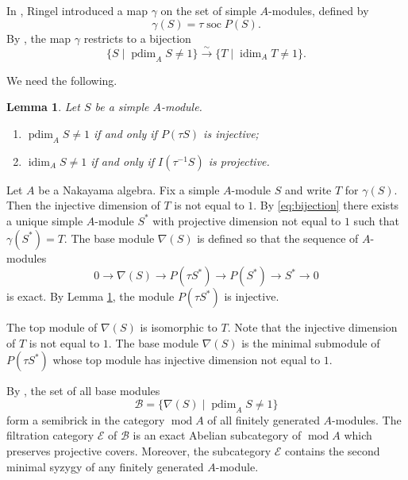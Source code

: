 \documentclass[a4paper,reqno]{amsart}
\numberwithin{equation}{section}
\theoremstyle{plain}
\newtheorem{lem}[thm]{Lemma}
\theoremstyle{definition}
\theoremstyle{remark}
\DeclareMathOperator{\soc}{soc}
\renewcommand{\mod}{\operatorname{mod}}
\DeclareMathOperator{\pdim}{pdim}
\DeclareMathOperator{\idim}{idim}
\newcommand{\lto}{\longrightarrow}
\renewcommand{\-}{\mbox{-}}
\newcommand{\scB}{\mathcal{B}}
\newcommand{\scE}{\mathcal{E}}
\begin{document}
In \cite{Rin13}, 
Ringel introduced a map \(\gamma\) on the set of simple \(A\)-modules, 
defined by
\begin{equation*} 
    \gamma(S)=\tau\soc P(S).
\end{equation*}
By  \cite[A.6]{Rin21}, the map \(\gamma\) restricts to a  bijection 
\begin{equation} \label{eq:bijection}
    \{S\mid \pdim_AS\neq 1\}\overset{\sim}\lto \{T\mid \idim_AT\neq 1\}.
\end{equation}

We need the following.

\begin{lem} \label{lem:pidim-1}
     Let \(S\) be a simple \(A\)-module.
    \begin{enumerate}
        \item \(\pdim_AS\neq 1\) if and only if \(P(\tau S)\) is injective;
        \item \(\idim_AS\neq 1\) if and only if \(I(\tau^{-1} S)\) is projective.
    \end{enumerate}
\end{lem}


Let \(A\) be a Nakayama algebra. 
Fix a simple \(A\)-module  \(S\) and write \(T\) for \(\gamma(S)\).
Then the injective dimension of \(T\) is not equal to \(1\).
By \eqref{eq:bijection} there exists a unique simple \(A\)-module \(S^*\) 
with projective dimension  not equal to \(1\) such that \(\gamma(S^*)=T\).
The {base module} \(\nabla(S)\) is defined 
so that the sequence of \(A\)-modules 
\begin{equation*}
    0\to \nabla(S)\to P(\tau S^*)\to P(S^*)\to S^*\to 0
\end{equation*}
is exact. 
By Lemma \ref{lem:pidim-1}, 
the module \(P(\tau S^*)\) is  injective.


The top module of \(\nabla(S)\) is isomorphic to \(T\).
Note that the injective dimension of \(T\) is not equal to \(1\).
The base module \(\nabla(S)\) is the minimal submodule of \(P(\tau{S^*})\) 
whose top module has injective dimension not equal to \(1\).


By \cite{Sen19,Rin21}, the set of all base modules
\begin{equation*}
    \scB=\{\nabla(S)\mid \pdim_AS\neq 1\}
\end{equation*}
form a semibrick in the category \(\mod A\) of all finitely generated \(A\)-modules.
The filtration category \(\scE\) of \(\scB\) is 
an exact Abelian subcategory of \(\mod A\) which preserves projective covers.
Moreover, the subcategory \(\scE\) contains the second minimal syzygy 
of any finitely generated \(A\)-module.
\end{document}
